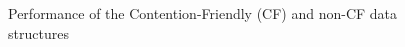 \begin{figure}
\begin{center}

\caption{Performance of the Contention-Friendly (CF) and non-CF data structures\label{fig:perf}}
\end{center}
\end{figure}



%



